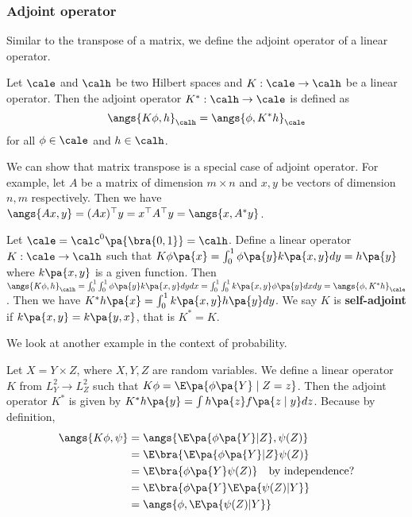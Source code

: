 \subsubsection{Adjoint operator} Similar to the transpose of a matrix, we define the adjoint operator of a
linear operator.
\begin{definition}
    Let $\cale$ and $\calh$ be two Hilbert spaces and $K:\cale\rightarrow\calh$ be a linear operator. Then the adjoint operator $K^*:\calh\rightarrow\cale$ is defined as
    \begin{equation*}
        \angs{K\phi,h}_{\calh}=\angs{\phi,K^*h}_{\cale}
    \end{equation*}
    for all $\phi\in\cale$ and $h\in\calh$.
\end{definition}
\begin{remark}
    We can show that matrix transpose is a special case of adjoint operator. For example, let $A$ be a matrix of dimension $m\times n$ and $x,y$ be vectors of dimension $n,m$ respectively. Then we have $\angs{Ax,y}=(Ax)^\top y= x^\top A^\top y = \angs{x,A^*y}$.
\end{remark}
\begin{example}
    Let $\cale = \calc^0\pa{\bra{0,1}}=\calh$. Define a linear operator $K:\cale\rightarrow\calh$ such that $K\phi\pa{x}=\int_0^1\phi\pa{y}k\pa{x,y}dy= h\pa{y}$ where $k\pa{x,y}$ is a given function. Then $\angs{K\phi,h}_{\calh}=\int_0^1\int_0^1\phi\pa{y}k\pa{x,y}dydx=\int_0^1\int_0^1k\pa{x,y}\phi\pa{y}dxdy=\angs{\phi,K^*h}_{\cale}$. Then we have $K^*h\pa{x}=\int_0^1k\pa{x,y}h\pa{y}dy$. We say $K$ is \textbf{self-adjoint} if $k\pa{x,y}=k\pa{y,x}$, that is $K^*=K$.
\end{example}
We look at another example in the context of probability.
\begin{example}
    Let $X=Y \times Z$, where $X,Y,Z$ are random variables. We define a linear operator $K$ from $L_Y^2 \to L_Z^2$ such that $K\phi=\E\pa{\phi\pa{Y}\mid Z=z}$. Then the adjoint operator $K^*$ is given by $K^*h\pa{y}=\int h\pa{z}f\pa{z\mid y}dz$. Because by definition,
    \begin{equation*}
        \begin{split}
            \angs{K\phi,\psi}&=\angs{\E\pa{\phi\pa{Y}|Z},\psi(Z)}\\
            & = \E\bra{\E\pa{\phi\pa{Y}| Z}\psi(Z)}\\
            & = \E\bra{\phi\pa{Y}\psi(Z)}\quad \text{by independence?}\\
            & = \E\bra{\phi\pa{Y}\E\pa{\psi(Z)| Y}}\\
            & = \angs{\phi,\E\pa{\psi(Z)| Y}}
        \end{split}
    \end{equation*}
\end{example}

